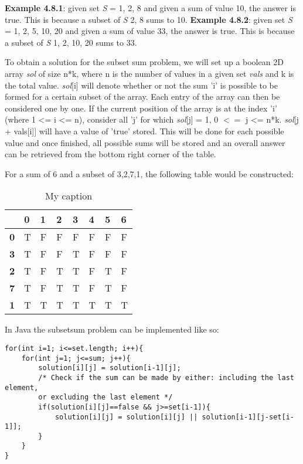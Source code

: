 
\medbreak
\textbf{Example 4.8.1}: given set \textit{S} = {1, 2, 8} and given a sum of value 10, the answer is true. This is because a subset of \textit{S} {2, 8} sums to 10.
\smallbreak
\textbf{Example 4.8.2}: given set \textit{S} = {1, 2, 5, 10, 20} and given a sum of value 33, the answer is true. This is because a subset of \textit{S} {1, 2, 10, 20} sums to 33.

To obtain a solution for the subset sum problem, we will set up a boolean 2D array \textit{sol} of size n*k, where n is the number of values in a given set \textit{vals} and k is the total value. \textit{sol}[i] will denote whether or not the sum 'i' is possible to be formed for a certain subset of the array. Each entry of the array can then be considered one by one. If the current position of the array is at the index 'i' (where 1 <= i <= n), consider all 'j' for which \textit{sol}[j] = 1, 0 $<=$  j <= n*k. \textit{sol}[j + vals[i]] will have a value of 'true' stored. This will be done for each possible value and once finished, all possible sums will be stored and an overall answer can be retrieved from the bottom right corner of the table.

For a sum of 6 and a subset of {3,2,7,1}, the following table would be constructed:

\begin{table}[]
	\centering
	\caption{My caption}
	\label{my-label}
	\begin{tabular}{|l|l|l|l|l|l|l|l|}
		\hline
		& \textbf{0} & \textbf{1} & \textbf{2} & \textbf{3} & \textbf{4} & \textbf{5} & \textbf{6} \\ \hline
		\textbf{0} & T & F & F & F & F & F & F \\ \hline
		\textbf{3} & T & F & F & T & F & F & F \\ \hline
		\textbf{2} & T & F & T & T & F & T & F \\ \hline
		\textbf{7} & T & F & T & T & F & T & F \\ \hline
		\textbf{1} & T & T & T & T & T & T & T \\ \hline
	\end{tabular}
\end{table}

\smallbreak\noindent
In Java the subsetsum problem can be implemented like so:

\begin{lstlisting}
for(int i=1; i<=set.length; i++){
	for(int j=1; j<=sum; j++){				
		solution[i][j] = solution[i-1][j];
		/* Check if the sum can be made by either: including the last element,
		or excluding the last element */
		if(solution[i][j]==false && j>=set[i-1]){
			solution[i][j] = solution[i][j] || solution[i-1][j-set[i-1]];				
		}
	}
}

\end{lstlisting}


